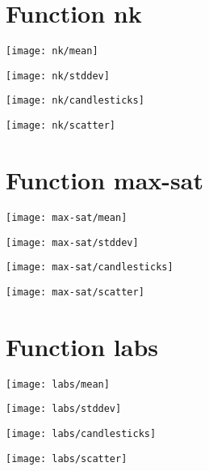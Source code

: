 \section{Function nk}
\begin{center}

\end{center}
\begin{center}
\texttt{[image: nk/mean]}
\end{center}
\begin{center}
\texttt{[image: nk/stddev]}
\end{center}
\begin{center}
\texttt{[image: nk/candlesticks]}
\end{center}
\begin{center}
\texttt{[image: nk/scatter]}
\end{center}
\newpage
\section{Function max-sat}
\begin{center}

\end{center}
\begin{center}
\texttt{[image: max-sat/mean]}
\end{center}
\begin{center}
\texttt{[image: max-sat/stddev]}
\end{center}
\begin{center}
\texttt{[image: max-sat/candlesticks]}
\end{center}
\begin{center}
\texttt{[image: max-sat/scatter]}
\end{center}
\newpage
\section{Function labs}
\begin{center}

\end{center}
\begin{center}
\texttt{[image: labs/mean]}
\end{center}
\begin{center}
\texttt{[image: labs/stddev]}
\end{center}
\begin{center}
\texttt{[image: labs/candlesticks]}
\end{center}
\begin{center}
\texttt{[image: labs/scatter]}
\end{center}
\newpage
